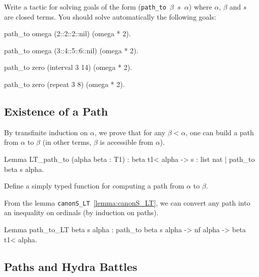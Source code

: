 \begin{exercise}
Write a tactic for solving goals of the form (\texttt{path\_to $\beta$ $s$ $\alpha$})
where $\alpha$, $\beta$ and $s$ are closed terms. 
You should solve automatically the following goals:

\begin{Coqsrc}
 path_to omega (2::2::2::nil) (omega * 2).

 path_to omega (3::4::5::6::nil) (omega * 2).

 path_to zero (interval 3 14) (omega * 2).

 path_to zero (repeat 3 8) (omega * 2).
\end{Coqsrc}

\end{exercise}



\subsection{Existence of a Path}


By transfinite induction on $\alpha$, we prove that for any $\beta<\alpha$, 
one can build a path from $\alpha$ to $\beta$ (in other terms, $\beta$ is accessible from $\alpha$).

\begin{Coqsrc}
Lemma LT_path_to (alpha beta : T1) :
  beta t1< alpha -> {s : list nat | path_to beta s alpha}.
\end{Coqsrc}


\begin{exercise}
Define a simply typed function for computing a path from $\alpha$ to $\beta$.
\end{exercise}


\noindent 
From the lemma \texttt{canonS\_LT}~\vref{lemma:canonS_LT}, we can convert any path into an inequality on ordinals (by induction on paths).


\begin{Coqsrc}
Lemma path_to_LT beta s alpha :
  path_to beta s alpha -> nf alpha -> beta t1< alpha.
\end{Coqsrc}

\subsection{Paths and Hydra Battles}
\label{KS-o2h}

